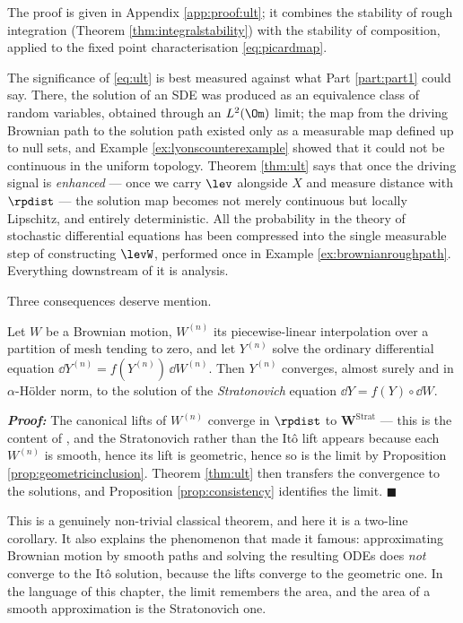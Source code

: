 The proof is given in Appendix \ref{app:proof:ult}; it combines the stability of rough integration
(Theorem \ref{thm:integralstability}) with the stability of composition, applied to the fixed point
characterisation \eqref{eq:picardmap}.

\medskip

The significance of \eqref{eq:ult} is best measured against what Part \ref{part:part1} could say.
There, the solution of an SDE was produced as an equivalence class of random variables, obtained
through an $L^2(\Om)$ limit; the map from the driving Brownian path to the solution path existed
only as a measurable map defined up to null sets, and Example \ref{ex:lyonscounterexample} showed
that it could not be continuous in the uniform topology. Theorem \ref{thm:ult} says that once the
driving signal is \emph{enhanced} --- once we carry $\lev$ alongside $X$ and measure distance with
$\rpdist$ --- the solution map becomes not merely continuous but locally Lipschitz, and entirely
deterministic. All the probability in the theory of stochastic differential equations has been
compressed into the single measurable step of constructing $\levW$, performed once in Example
\ref{ex:brownianroughpath}. Everything downstream of it is analysis.

Three consequences deserve mention.

\begin{corollary}\label{cor:wongzakai}
Let $W$ be a Brownian motion, $W^{(n)}$ its piecewise-linear interpolation over a partition of mesh
tending to zero, and let $Y^{(n)}$ solve the ordinary differential equation
$\dd Y^{(n)} = f(Y^{(n)})\,\dd W^{(n)}$. Then $Y^{(n)}$ converges, almost surely and in
$\alpha$-Hölder norm, to the solution of the \emph{Stratonovich} equation
$\dd Y = f(Y)\circ \dd W$.
\end{corollary}

\textbf{\textit{Proof:}} The canonical lifts of $W^{(n)}$ converge in $\rpdist$ to
$\mathbf{W}^{\mathrm{Strat}}$ --- this is the content of \cite[Ch.\ 3]{frizhairer2020}, and the
Stratonovich rather than the Itô lift appears because each $W^{(n)}$ is smooth, hence its lift is
geometric, hence so is the limit by Proposition \ref{prop:geometricinclusion}. Theorem
\ref{thm:ult} then transfers the convergence to the solutions, and Proposition
\ref{prop:consistency} identifies the limit. \hfill $\blacksquare$

\medskip

This is a genuinely non-trivial classical theorem, and here it is a two-line corollary. It also
explains the phenomenon that made it famous: approximating Brownian motion by smooth paths and
solving the resulting ODEs does \emph{not} converge to the Itô solution, because the lifts converge
to the geometric one. In the language of this chapter, the limit remembers the area, and the area of
a smooth approximation is the Stratonovich one.

